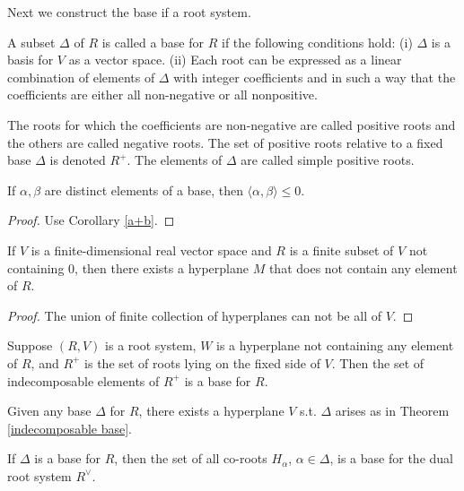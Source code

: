 Next we construct the base if a root system.
\begin{definition}[Base]
    A subset $\Delta$ of $R$ is called a base for $R$ if the following conditions hold:\newline 
    (i) $\Delta$ is a basis for $V$ as a vector space.\newline 
    (ii) Each root can be expressed as a linear combination of elements of $\Delta$ with integer coefficients and 
    in such a way that the coefficients are either all non-negative or all nonpositive.

    The roots for which the coefficients are non-negative are called positive roots and the others are called negative roots.
    The set of positive roots relative to a fixed base $\Delta$ is denoted $R^+$. The elements of $\Delta$ are called simple positive roots.
\end{definition}
\begin{lemma}
    If $\alpha,\beta$ are distinct elements of a base, then $\langle\alpha,\beta\rangle\le 0$. 
\end{lemma}
\begin{proof}
    Use Corollary \ref{a+b}.
\end{proof}
\begin{lemma}
    If $V$ is a finite-dimensional real vector space and $R$ is a finite subset of $V$ not containing $0$,
    then there exists a hyperplane $M$ that does not contain any element of $R$.
\end{lemma}
\begin{proof}
    The union of finite collection of hyperplanes can not be all of $V$.
\end{proof}
\begin{definition}[Indecomposability]
    
\end{definition}
\begin{theorem}\label{indecomposable base}
    Suppose $(R,V)$ is a root system, $W$ is a hyperplane not containing any element of $R$, and $R^+$ is the set of roots lying on the
    fixed side of $V$. Then the set of indecomposable elements of $R^+$ is a base for $R$.
\end{theorem}

\begin{theorem}
    Given any base $\Delta$ for $R$, there exists a hyperplane $V$ s.t. $\Delta$ arises as in Theorem \ref{indecomposable base}.
\end{theorem}

\begin{theorem}\label{Base for Dual Root System}
    If $\Delta$ is a base for $R$, then the set of all co-roots $H_\alpha$, $\alpha\in\Delta$, is a base for the dual root system $R^\vee$.
\end{theorem}


